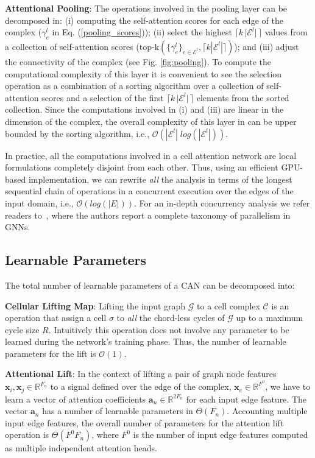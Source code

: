\documentclass{article}
\begin{document}
\textbf{Attentional Pooling}: The operations involved in the pooling layer can be decomposed in: (i) computing the self-attention scores for each edge of the complex ($\gamma_e^l$ in  Eq. (\ref{pooling_scores})); (ii) select the highest $\lceil k \, \vert \mathcal{E}^{l} \vert \, \rceil$ values from a collection of self-attention scores ($\text{top-k}(\{\gamma^l_e\}_{e \in \mathcal{E}^l}, \lceil k |\mathcal{E}^l| \rceil)$); and (iii) adjust the connectivity of the complex (see Fig. \ref{fig:pooling}). To compute the computational complexity of this layer it is convenient to see the selection operation as a combination of a sorting algorithm over a collection of self-attention scores and a selection of the first $\lceil k \, \vert \mathcal{E}^{l} \vert \, \rceil$ elements from the sorted collection. Since the computations involved in (i) and (iii) are linear in the dimension of the complex, the overall complexity of this layer in can be upper bounded by the sorting algorithm, i.e., $\mathcal{O}(|\mathcal{E}^{l}| \; log (|\mathcal{E}^{l}|))$.


In practice, all the computations involved in a cell attention network are local formulations completely disjoint from each other. Thus, using an efficient GPU-based implementation, we can rewrite \emph{all} the analysis in terms of the longest sequential chain of operations in a concurrent execution over the edges of the input domain, i.e., $\mathcal{O}(log(|E|))$. For an in-depth concurrency analysis we refer readers to~\cite{Besta22parallel}, where the authors report a complete taxonomy of parallelism in GNNs.   

\subsection{Learnable Parameters}

The total number of learnable parameters of a CAN can be decomposed into:

\textbf{Cellular Lifting Map}: Lifting the input graph $\mathcal{G}$ to a cell complex $\mathcal{C}$ is an operation that assign a cell $\sigma$ to \emph{all} the chord-less cycles of $\mathcal{G}$ up to a maximum cycle size $R$. Intuitively this operation does not involve any parameter to be learned during the network's training phase. Thus, the number of learnable parameters for the lift is $\mathcal{O}(1)$.

\textbf{Attentional Lift}: In the context of lifting a pair of graph node features $\mathbf{x}_i, \mathbf{x}_j \in \mathbb{R}^{F_n}$ to a signal defined over the edge of the complex, $\mathbf{x}_{e} \in \mathbb{R}^{F^0}$, we have to learn a vector of attention coefficients $\mathbf{a}_{n} \in \mathbb{R}^{2 F_n}$ for each input edge feature. The vector $\mathbf{a}_{n}$ has a number of learnable parameters in $\Theta \left( F_n \right)$. Accounting multiple input edge features, the overall number of parameters for the attention lift operation is $\Theta(F^0 F_n)$, where $F^0$ is the number of input edge features computed as multiple independent attention heads.
\end{document}
